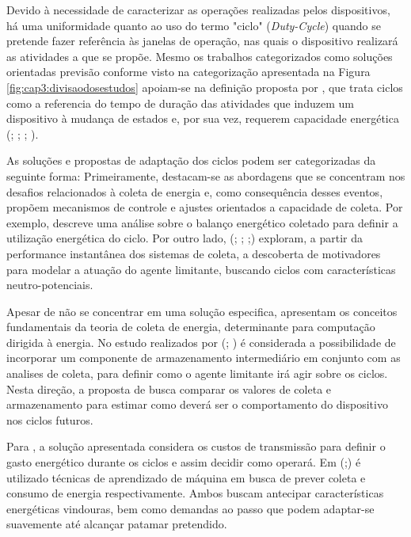 Devido à necessidade de caracterizar as operações realizadas pelos dispositivos, há uma uniformidade quanto ao uso do termo "ciclo" (\textit{Duty-Cycle}) quando se pretende fazer referência às janelas de operação, nas quais o dispositivo realizará as atividades a que se propõe. Mesmo os trabalhos categorizados como soluções orientadas previsão  conforme visto na categorização apresentada na Figura \ref{fig:cap3:divisaodosestudos} apoiam-se na definição proposta por , que trata ciclos como a referencia do tempo de duração das atividades que induzem um dispositivo à mudança de estados e, por sua vez, requerem capacidade energética (; ; ; ). 

As soluções e propostas de adaptação dos ciclos podem ser categorizadas da seguinte forma: Primeiramente, destacam-se as abordagens que se concentram nos desafios relacionados à coleta de energia e, como consequência desses eventos, propõem mecanismos de controle e ajustes orientados a capacidade de coleta. Por exemplo,  descreve uma análise sobre o balanço energético coletado para definir a utilização energética do ciclo. Por outro lado, (; ; ;) exploram, a partir da performance instantânea dos sistemas de coleta, a descoberta de motivadores para modelar a atuação do agente limitante, buscando ciclos com características neutro-potenciais.


Apesar de não se concentrar em uma solução especifica,  apresentam os conceitos fundamentais da teoria de coleta de energia, determinante para computação dirigida à energia. No estudo realizados por (; ) é considerada a possibilidade de incorporar um componente de armazenamento intermediário em conjunto com as analises de coleta, para definir como o agente limitante irá agir sobre os ciclos. Nesta direção, a proposta de  busca comparar os valores de coleta e armazenamento para estimar como deverá ser o comportamento do dispositivo nos ciclos futuros.

Para , a solução apresentada considera os custos de transmissão para definir o gasto energético durante os ciclos e assim decidir como operará. Em (;) é utilizado técnicas de aprendizado de máquina em busca de prever coleta e consumo de energia respectivamente. Ambos buscam antecipar características energéticas vindouras, bem como demandas ao passo que podem adaptar-se suavemente até alcançar patamar pretendido.

